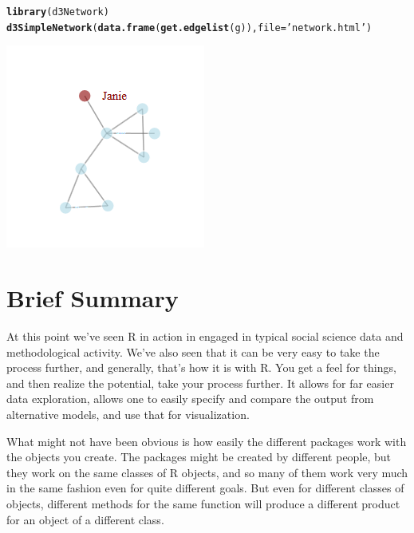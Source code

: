 \documentclass[english,nohyper,titlepage]{tufte-handout}\usepackage[]{graphicx}\usepackage[]{color}
\makeatletter
\newcommand{\hlstr}[1]{\textcolor[rgb]{0.192,0.494,0.8}{#1}}%
\newcommand{\hlstd}[1]{\textcolor[rgb]{0.345,0.345,0.345}{#1}}%
\newcommand{\hlkwc}[1]{\textcolor[rgb]{0.333,0.667,0.333}{#1}}%
\newcommand{\hlkwd}[1]{\textcolor[rgb]{0.737,0.353,0.396}{\textbf{#1}}}%
\newenvironment{kframe}{%
 \def\at@end@of@kframe{}%
 \ifinner\ifhmode%
  \def\at@end@of@kframe{\end{minipage}}%
  \begin{minipage}{\columnwidth}%
 \fi\fi%
 \def\FrameCommand##1{\hskip\@totalleftmargin \hskip-\fboxsep
 \colorbox{shadecolor}{##1}\hskip-\fboxsep
     \hskip-\linewidth \hskip-\@totalleftmargin \hskip\columnwidth}%
 \MakeFramed {\advance\hsize-\width
   \@totalleftmargin\z@ \linewidth\hsize
   \@setminipage}}%
 {\par\unskip\endMakeFramed%
 \at@end@of@kframe}
\newenvironment{knitrout}{}{} %
\makeatother
\begin{document}
\begin{knitrout}\footnotesize
{}\color{fgcolor}\begin{kframe}
\begin{alltt}
\hlkwd{library}\hlstd{(d3Network)}
\hlkwd{d3SimpleNetwork}\hlstd{(}\hlkwd{data.frame}\hlstd{(}\hlkwd{get.edgelist}\hlstd{(g)),} \hlkwc{file}\hlstd{=}\hlstr{'network.html'}\hlstd{)}
\end{alltt}
\end{kframe}
\end{knitrout}
\includegraphics[scale=.9]{d3network}





\part{Brief Summary}
At this point we've seen R in action in engaged in typical social science data and methodological activity.  We've also seen that it can be very easy to take the process further, and generally, that's how it is with R.  You get a feel for things, and then realize the potential, take your process further.  It allows for far easier data exploration, allows one to easily specify and compare the output from alternative models, and use that for visualization.

What might not have been obvious is how easily the different packages work with the objects you create.  The packages might be created by different people, but they work on the same classes of R objects, and so many of them work very much in the same fashion even for quite different goals. But even for different classes of objects, different methods for the same function will produce a different product for an object of a different class.  
\end{document}
